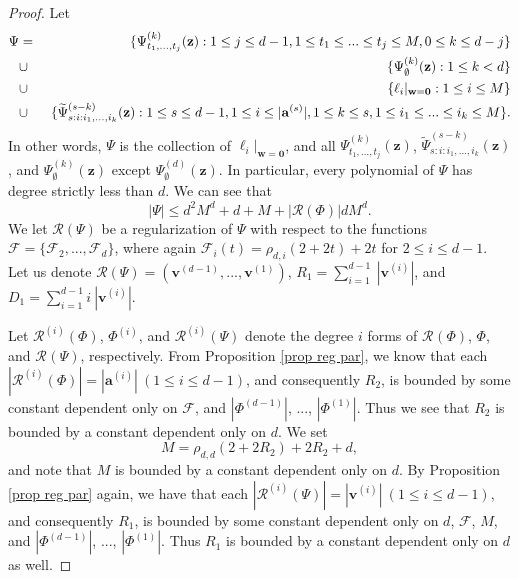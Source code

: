 \documentclass[12pt]{amsart}
\theoremstyle{definition}
\theoremstyle{remark}
\numberwithin{equation}{section}
\begin{document}
\begin{proof}
Let
\begin{eqnarray}
\Psi &=& \{  \Psi^{(k)}_{t_1, ..., t_{j}} (\mathbf{z}): 1 \leq j \leq d-1, 1 \leq t_1 \leq ... \leq t_{j} \leq M ,   0 \leq k \leq d-j  \}
\notag
\\
&\cup&  \  \{ {\Psi}^{(k)}_{\emptyset}(\mathbf{z}) : 1 \leq k < d \}
\notag
\\
&\cup&
\notag
\{ \ell_i |_{\mathbf{w} = \mathbf{0}} : 1 \leq i \leq M \}
\\
&\cup&  \  \{ \widetilde{\Psi}^{(s - k)}_{{s} :i: i_1, ..., i_k}(\mathbf{z}) :1 \leq {s} \leq d-1, 1 \leq i \leq |\mathbf{a}^{(s)}|, 1 \leq k \leq {s}, 1 \leq i_1 \leq ... \leq i_k \leq M  \}.
\notag
\end{eqnarray}
In other words, $\Psi$ is the collection of $\ell_i |_{\mathbf{w} = \mathbf{0}}$, and all $ \Psi^{(k)}_{t_1, ..., t_{j}} (\mathbf{z})$,
$\widetilde{\Psi}^{(s - k)}_{{s} :i: i_1, ..., i_k}(\mathbf{z})$, and
${\Psi}^{(k)}_{\emptyset}(\mathbf{z})$ except ${\Psi}^{(d)}_{\emptyset}(\mathbf{z})$. In particular, every polynomial of $\Psi$ has degree strictly less than $d$.
We can see that
$$
|\Psi| \leq d^2 M^d + d + M + |\mathcal{R}(\Phi) | d M^d.
$$
We let $\mathcal{R}(\Psi)$ be a regularization of
$\Psi$ with respect
to the functions $\boldsymbol{\mathcal{F}} = \{\mathcal{F}_2, ..., \mathcal{F}_d\}$, where again $\mathcal{F}_i(t) = {\rho}_{d,i} (2 + 2 t) + 2t$ for $2 \leq i \leq d-1$.
Let us denote $\mathcal{R}(\Psi) = (\mathbf{v}^{(d-1)}, ..., \mathbf{v}^{(1)} )$, $R_1 = \sum_{i = 1}^{d-1} \ | \mathbf{v}^{(i)} |$, and $D_1 = \sum_{i = 1}^{d-1} i \ | \mathbf{v}^{(i)} |$.

Let $\mathcal{R}^{(i)}(\Phi)$, $\Phi^{(i)}$, and $\mathcal{R}^{(i)}(\Psi)$ denote the degree $i$ forms of $\mathcal{R}^{}(\Phi)$, $\Phi$, and $\mathcal{R}^{}(\Psi)$, respectively.
From Proposition \ref{prop reg par}, we know that each $|\mathcal{R}^{(i)}(\Phi)| = |\mathbf{a}^{(i)}| \ (1 \leq i \leq d-1)$, and consequently $R_2$, is bounded by some constant dependent only on $\boldsymbol{\mathcal{F}}$, and $|\Phi^{(d-1)}|$, ..., $|\Phi^{(1)}|$. Thus we see that $R_2$ is bounded by a constant dependent only
on $d$.
We set
$$
M =  \rho_{d,d}( 2 + 2 R_2) + 2 R_2  + d,
$$
and note that $M$ is bounded by a constant dependent only on $d$.
By Proposition \ref{prop reg par} again,
we have that each $|\mathcal{R}^{(i)}(\Psi)| = |\mathbf{v}^{(i)}| \ (1 \leq i \leq d-1)$, and consequently $R_1$, is bounded by some constant dependent only
on $d$, $\boldsymbol{\mathcal{F}}$, $M$, and $|\Phi^{(d-1)}|$, ..., $|\Phi^{(1)}|$.
Thus $R_1$ is bounded by a constant dependent only on $d$ as well.


\end{proof}
\end{document}
